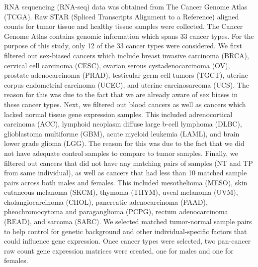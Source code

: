 \documentclass[10pt]{article}
\begin{document}
	RNA sequencing (RNA-seq) data was obtained from The Cancer Genome Atlas (TCGA). Raw STAR (Spliced Transcripts Alignment to a Reference) aligned counts for tumor tissue and healthy tissue samples were collected. The Cancer Genome Atlas contains genomic information which spans 33 cancer types. For the purpose of this study, only 12 of the 33 cancer types were considered. We first filtered out sex-biased cancers which include breast invasive carcinoma (BRCA), cervical cell carcinoma (CESC), ovarian serous cystadenocarcinoma (OV), prostate adenocarcinoma (PRAD), testicular germ cell tumors (TGCT), uterine corpus endometrial carcinoma (UCEC), and uterine carcinosarcoma (UCS). The reason for this was due to the fact that we are already aware of sex biases in these cancer types. Next, we filtered out blood cancers as well as cancers which lacked normal tissue gene expression samples. This included adrenocortical carcinoma (ACC), lymphoid neoplasm diffuse large b-cell lymphoma (DLBC), glioblastoma multiforme (GBM), acute myeloid leukemia (LAML), and brain lower grade glioma (LGG). The reason for this was due to the fact that we did not have adequate control samples to compare to tumor samples. Finally, we filtered out cancers that did not have any matching pairs of samples (NT and TP from same individual), as well as cancers that had less than 10 matched sample pairs across both males and females. This included mesothelioma (MESO), skin cutaneous melanoma (SKCM), thymoma (THYM), uveal melanoma (UVM), cholangiocarcinoma (CHOL), pancreatic adenocarcinoma (PAAD), pheochromocytoma and paraganglioma (PCPG), rectum adenocarcinoma (READ), and sarcoma (SARC). We selected matched tumor-normal sample pairs to help control for genetic background and other individual-specific factors that could influence gene expression. Once cancer types were selected, two pan-cancer raw count gene expression matrices were created, one for males and one for females.
	
\end{document}
